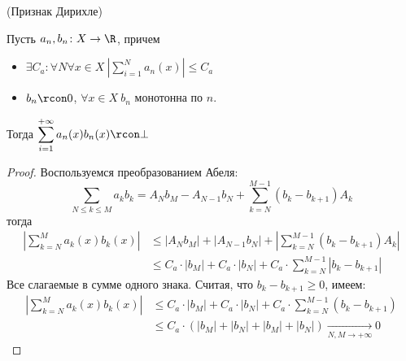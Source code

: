 \begin{theorem}(Признак Дирихле)

    Пусть $a_n, b_n \colon X \to \R$, причем
\begin{itemize}
    \item $\displaystyle \exists C_a\colon \forall
   N \forall x \in X~ \left| \sum_{i = 1}^{N}{a_n(x)} \right| \leqslant C_a$
    \item $b_n \rcon 0$, $\forall x \in X~ b_n$ монотонна по $n$.
\end{itemize}
    Тогда
    $\displaystyle \sum_{i = 1}^{+\infty}{a_n(x) b_n(x)} \rcon \bot$
\end{theorem}
\begin{proof}
    Воспользуемся преобразованием Абеля:
\[
    \sum_{N \leqslant k \leqslant M}{a_k b_k} = A_N b_M - A_{N - 1}b_N +
    \sum_{k = N}^{M - 1}{(b_k - b_{k + 1}) A_k}
\]
    тогда
\begin{align*}
    \left|\sum_{k = N}^{M}{a_k(x) b_k(x)}\right| &\leqslant |A_N b_M|
    + |A_{N - 1}b_N| + \left| \sum_{k = N}^{M - 1}{(b_k - b_{k + 1})A_k}
    \right|\\
    &\leqslant C_a \cdot |b_M| + C_a \cdot |b_N| + C_a \cdot
    \sum_{k = N}^{M - 1}{|b_k - b_{k + 1}|}
\end{align*}
    Все слагаемые в сумме одного знака. Считая, что $b_k - b_{k + 1} \geqslant
    0$, имеем:
\begin{align*}
    \left|\sum_{k = N}^{M}{a_k(x) b_k(x)}\right| &\leqslant C_a \cdot |b_M| +
    C_a \cdot |b_N| + C_a \cdot \sum_{k = N}^{M - 1}{(b_k - b_{k + 1})} \\
    &\leqslant C_a \cdot (|b_M| + |b_N| + |b_M| + |b_N|) \xrightarrow[N, M \to
    +\infty]{} 0
\end{align*}
\end{proof}

